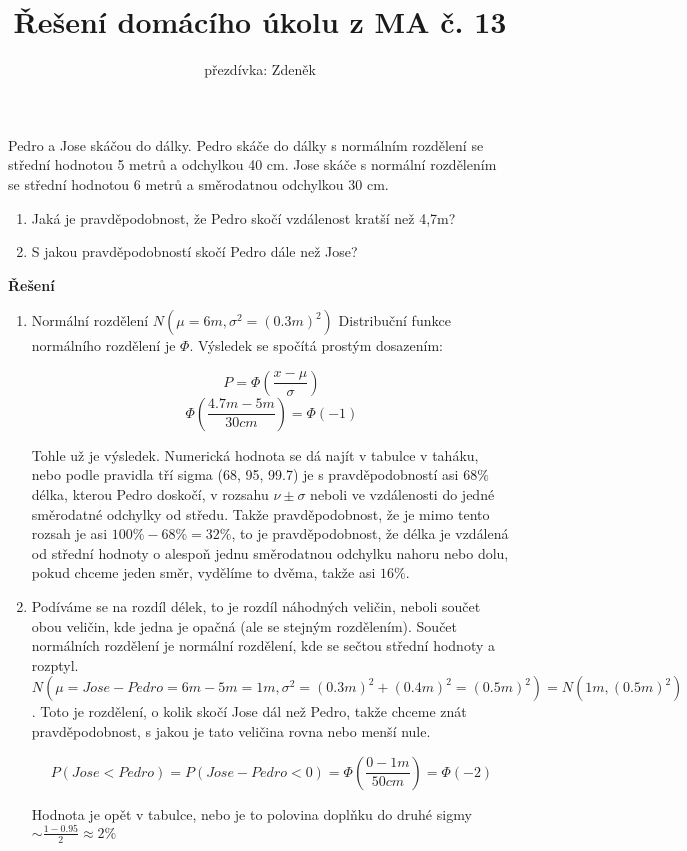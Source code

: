 \documentclass[10pt,a4paper]{article}
\title{Řešení domácího úkolu z MA č. 13}
\author{přezdívka: Zdeněk}
\date{}
\theoremstyle{plain}
\theoremstyle{definition}
\begin{document}
Pedro a Jose skáčou do dálky. Pedro skáče do dálky s normálním rozdělení se střední hodnotou 5 metrů a odchylkou 40 cm. Jose skáče s normální rozdělením se střední hodnotou 6 metrů a směrodatnou odchylkou 30 cm. \begin{enumerate}
\item Jaká je pravděpodobnost, že Pedro skočí vzdálenost kratší než 4,7m?
\item S jakou pravděpodobností skočí Pedro dále než Jose?
\end{enumerate}

\textbf{Řešení}

\begin{enumerate}
\item Normální rozdělení $N(\mu = 6m, \sigma^2 = (0.3m)^2)$
Distribuční funkce normálního rozdělení je $\Phi$. Výsledek se spočítá prostým dosazením:

\[P = \Phi\left(\frac{x-\mu}{\sigma}\right)\]
\[\Phi\left(\frac{4.7m-5m}{30 cm}\right) = \Phi(-1) \]

Tohle už je výsledek. Numerická hodnota se dá najít v tabulce v taháku, nebo podle pravidla tří sigma (68, 95, 99.7) je s pravděpodobností asi $68\%$ délka, kterou Pedro doskočí, v rozsahu $\nu \pm \sigma$ neboli ve vzdálenosti do jedné směrodatné odchylky od středu. Takže pravděpodobnost, že je mimo tento rozsah je asi $100\% - 68\% = 32\%$, to je pravděpodobnost, že délka je vzdálená od střední hodnoty o alespoň jednu směrodatnou odchylku nahoru nebo dolu, pokud chceme jeden směr, vydělíme to dvěma, takže asi $16\%$.

\item Podíváme se na rozdíl délek, to je rozdíl náhodných veličin, neboli součet obou veličin, kde jedna je opačná (ale se stejným rozdělením). Součet normálních rozdělení je normální rozdělení, kde se sečtou střední hodnoty a rozptyl. $N(\mu = Jose - Pedro = 6m - 5m = 1m,   \sigma^2 = (0.3m)^2 + (0.4m)^2 = (0.5m)^2 ) = N(1m, (0.5m)^2)$. Toto je rozdělení, o kolik skočí Jose dál než Pedro, takže chceme znát pravděpodobnost, s jakou je tato veličina rovna nebo menší nule.

\[ P(Jose < Pedro) = P(Jose - Pedro < 0) = \Phi\left(\frac{0-1m}{50 cm}\right) = \Phi(-2) \]

Hodnota je opět v tabulce, nebo je to polovina doplňku do druhé sigmy $\sim \frac{1-0.95}{2} \approx 2\%$



\end{enumerate}
\end{document}
